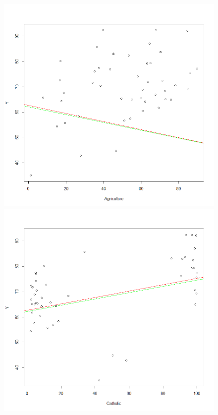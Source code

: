 \documentclass[a4paper, twocolumn]{article}
\begin{document}
        \begin{figure}[H]
        \centering
        \begin{minipage}[]{0.24\textwidth}
        \includegraphics[width=\textwidth]{share/Lab2A1_lr_A.png}  
        \end{minipage}
        \begin{minipage}[]{0.24\textwidth}
        \includegraphics[width=\textwidth]{share/Lab2A1_lr_C.png}  

\end{minipage}
\end{figure}
\end{document}
